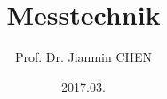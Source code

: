 \documentclass[english,ngerman]{beamer}
\newcommand\makebeamertitle{\frame{\maketitle}}%
\begin{document}
\title{Messtechnik }

\author{Prof. Dr. Jianmin CHEN}


\date{}

\date[SS17]{2017.03.}

\makebeamertitle
\end{document}
